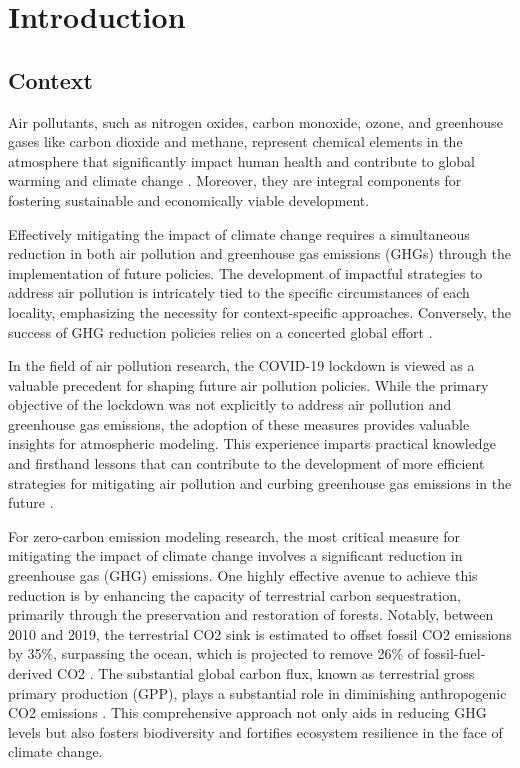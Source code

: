 \chapter{Introduction}
\renewcommand{\headrulewidth}{0pt}
\lhead[\thepage]{\leftmark}
\rhead[\leftmark]{\thepage}
\cfoot[]{}

 \section{Context}

 Air pollutants, such as nitrogen oxides, carbon monoxide, ozone, and greenhouse gases like carbon dioxide and methane, represent chemical elements in the atmosphere that significantly impact human health \citep{kampa2008human} and contribute to global warming and climate change \citep{haines2006climate}. Moreover, they are integral components for fostering sustainable and economically viable development. \par

Effectively mitigating the impact of climate change requires a simultaneous reduction in both air pollution and greenhouse gas emissions (GHGs) through the implementation of future policies. The development of impactful strategies to address air pollution is intricately tied to the specific circumstances of each locality, emphasizing the necessity for context-specific approaches. Conversely, the success of GHG reduction policies relies on a concerted global effort \citep{keohane2011regime}.\par

In the field of air pollution research, the COVID-19 lockdown is viewed as a valuable precedent for shaping future air pollution policies. While the primary objective of the lockdown was not explicitly to address air pollution and greenhouse gas emissions, the adoption of these measures provides valuable insights for atmospheric modeling. This experience imparts practical knowledge and firsthand lessons that can contribute to the development of more efficient strategies for mitigating air pollution and curbing greenhouse gas emissions in the future \citep{grange2021covid}. \par

For zero-carbon emission modeling research, the most critical measure for mitigating the impact of climate change involves a significant reduction in greenhouse gas (GHG) emissions. One highly effective avenue to achieve this reduction is by enhancing the capacity of terrestrial carbon sequestration, primarily through the preservation and restoration of forests. Notably, between 2010 and 2019, the terrestrial CO2 sink is estimated to offset fossil CO2 emissions by 35\%, surpassing the ocean, which is projected to remove 26\% of fossil-fuel-derived CO2 \citep{friedlingstein2020global, wang2022disentangling}. The substantial global carbon flux, known as terrestrial gross primary production (GPP), plays a substantial role in diminishing anthropogenic CO2 emissions \citep{beer2010terrestrial}. This comprehensive approach not only aids in reducing GHG levels but also fosters biodiversity and fortifies ecosystem resilience in the face of climate change. \par

